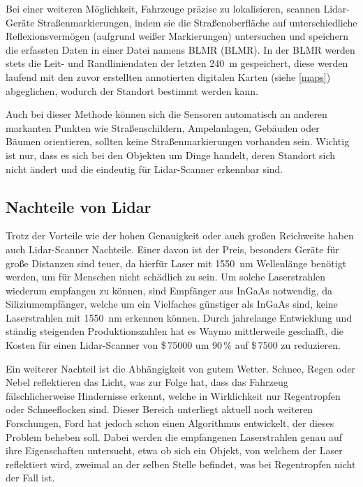 Bei einer weiteren Möglichkeit, Fahrzeuge präzise zu lokalisieren, scannen \acs{Lidar}-Geräte Straßenmarkierungen, indem sie die Straßenoberfläche auf unterschiedliche Reflexionsvermögen (aufgrund weißer Markierungen) untersuchen und speichern die erfassten Daten in einer Datei namens \acs{BLMR} (\acl{BLMR}). In der \acs{BLMR} werden stets die Leit- und Randliniendaten der letzten \SI{240}{\meter} gespeichert, diese werden laufend mit den zuvor erstellten annotierten digitalen Karten (siehe \ref{maps}) abgeglichen, wodurch der Standort bestimmt werden kann. 

Auch bei dieser Methode können sich die Sensoren automatisch an anderen markanten Punkten wie Straßenschildern, Ampelanlagen, Gebäuden oder Bäumen orientieren, sollten keine Straßenmarkierungen vorhanden sein. Wichtig ist nur, dass es sich bei den Objekten um Dinge handelt, deren Standort sich nicht ändert und die eindeutig für \acs{Lidar}-Scanner erkennbar sind.

\subsection*{Nachteile von Lidar}

Trotz der Vorteile wie der hohen Genauigkeit oder auch großen Reichweite haben auch \acs{Lidar}-Scanner Nachteile. Einer davon ist der Preis, besonders Geräte für große Distanzen sind teuer, da hierfür Laser mit \SI{1550}{\nano\meter} Wellenlänge benötigt werden, um für Menschen nicht schädlich zu sein. Um solche Laserstrahlen wiederum empfangen zu können, sind Empfänger aus \ac{InGaAs} notwendig, da Siliziumempfänger, welche um ein Vielfaches günstiger als \ac{InGaAs} sind, keine Laserstrahlen mit \SI{1550}{\nano\meter} erkennen können.  Durch jahrelange Entwicklung und ständig steigenden Produktionszahlen hat es Waymo mittlerweile geschafft, die Kosten für einen \acs{Lidar}-Scanner von \$\,\num{75000} um 90\,\% auf \$\,\num{7500} zu reduzieren. 

Ein weiterer Nachteil ist die Abhängigkeit von gutem Wetter. Schnee, Regen oder Nebel reflektieren das Licht, was zur Folge hat, dass das Fahrzeug fälschlicherweise Hindernisse erkennt, welche in Wirklichkeit nur Regentropfen oder Schneeflocken sind. Dieser Bereich unterliegt aktuell noch weiteren Forschungen, Ford hat jedoch schon einen Algorithmus entwickelt, der dieses Problem beheben soll. Dabei werden die empfangenen Laserstrahlen genau auf ihre Eigenschaften untersucht, etwa ob sich ein Objekt, von welchem der Laser reflektiert wird, zweimal an der selben Stelle befindet, was bei Regentropfen nicht der Fall ist. 


